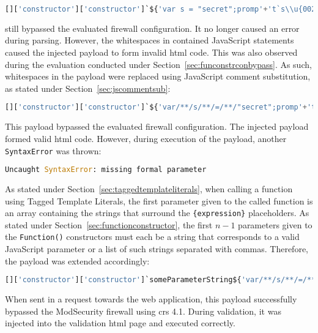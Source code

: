 \begin{lstlisting}[style=basicStyle, language=Python]
[]['constructor']['constructor']`${'var s = "secret";promp'+'t`s\\u{0024}{s}`'}```
\end{lstlisting}
still bypassed the evaluated firewall configuration. It no longer caused an error during parsing. However, the whitespaces in contained JavaScript statements caused the injected payload to form invalid \acrshort{html} code. This was also observed during the evaluation conducted under Section~\ref{sec:funconstrconbypass}. As such, whitespaces in the payload were replaced using JavaScript comment substitution, as stated under Section~\ref{sec:jscommentsub}:

\begin{lstlisting}[style=basicStyle, language=Python]
[]['constructor']['constructor']`${'var/**/s/**/=/**/"secret";promp'+'t`s\\u{0024}{s}`'}```
\end{lstlisting}
This payload bypassed the evaluated firewall configuration. The injected payload formed valid \acrshort{html} code. However, during execution of the payload, another \verb|SyntaxError| was thrown:

\begin{lstlisting}[style=basicStyle, language=Python]
Uncaught SyntaxError: missing formal parameter
\end{lstlisting}
As stated under Section~\ref{sec:taggedtemplateliterals}, when calling a function using Tagged Template Literals, the first parameter given to the called function is an array containing the strings that surround the \verb|{expression}| placeholders. As stated under Section~\ref{sec:functionconstructor}, the first $n-1$ parameters given to the \verb|Function()| constructors must each be a string that corresponds to a valid JavaScript parameter or a list of such strings separated with commas. 
Therefore, the payload was extended accordingly:

\begin{lstlisting}[style=basicStyle, language=Python, caption={Avoiding () bypass}, label={lst:avoiding () bypass}]
[]['constructor']['constructor']`someParameterString${'var/**/s/**/=/**/"secret";promp'+'t`s\\u{0024}{s}`'}```
\end{lstlisting}
When sent in a request towards the web application, this payload successfully bypassed the ModSecurity firewall using \acrshort{crs} 4.1. During validation, it was injected into the validation \acrshort{html} page and executed correctly. 

